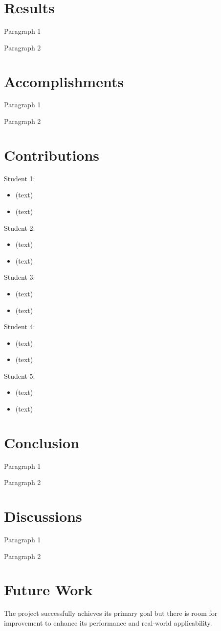 \documentclass[12pt, a4paper]{report}
\begin{document}
\section{Results}
Paragraph 1

Paragraph 2

\section{Accomplishments}
Paragraph 1

Paragraph 2

\section{Contributions}
Student 1:
\begin{itemize}
  \item (text)
  \item (text)
\end{itemize}
Student 2:
\begin{itemize}
  \item (text)
  \item (text)
\end{itemize}
Student 3:
\begin{itemize}
  \item (text)
  \item (text)
\end{itemize}
Student 4:
\begin{itemize}
  \item (text)
  \item (text)
\end{itemize}
Student 5:
\begin{itemize}
  \item (text)
  \item (text)
\end{itemize}

\section{Conclusion}
Paragraph 1

Paragraph 2

\section{Discussions}
Paragraph 1

Paragraph 2

\section{Future Work}
The project successfully achieves its primary goal but there is room for improvement to enhance its performance and real-world applicability.
\end{document}
